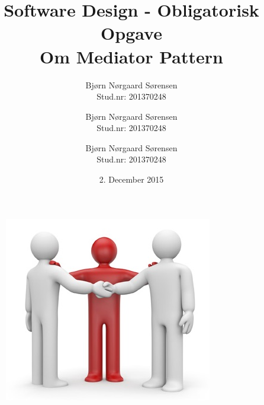 \title{
	\textbf{Software Design - Obligatorisk Opgave}
	\\ 
	Om Mediator Pattern
}

\date{
	2. December 2015
}

\author{
	Bjørn Nørgaard Sørensen\\
	Stud.nr: 201370248
	\and
	Bjørn Nørgaard Sørensen\\
	Stud.nr: 201370248
	\and
	Bjørn Nørgaard Sørensen\\
	Stud.nr: 201370248
}

\begin{titlepage}
	\maketitle
	\begin{figure}[h]
		\centering
		\includegraphics[width=0.7\linewidth]{figs/mediator}
	\end{figure}

\end{titlepage}
\pagebreak
